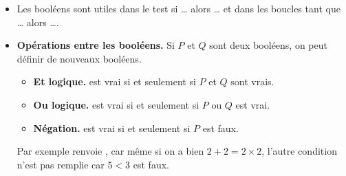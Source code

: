 \documentclass[11pt,class=report,crop=false]{standalone}
\begin{document}
\begin{cours}[Booléens]
\begin{itemize}
  \item Les booléens sont utiles dans le test \og{}si \ldots{} alors \ldots\fg{} et dans les boucles \og{}tant que \ldots{} alors \ldots\fg{}.
  
  \item \textbf{Opérations entre les booléens.}
  Si $P$ et $Q$ sont deux booléens, on peut définir de nouveaux booléens.
  \begin{itemize}
    \item \textbf{Et logique.}\quad \og{}\fg{} est vrai si et seulement si $P$ et $Q$ sont vrais.
    	\item \textbf{Ou logique.}\quad \og{}\fg{} est vrai si et seulement si $P$ ou $Q$ est vrai.
    	\item \textbf{Négation.}\quad \og{}\fg{} est vrai si et seulement si $P$ est faux.
  \end{itemize}  
  
  Par exemple \og{}\fg{} renvoie , car
  même si on a bien $2+2 = 2 \times 2$, l'autre condition n'est pas remplie car $5 < 3$ est faux.
  
  
  
\end{itemize}
\end{cours}




\end{document}
